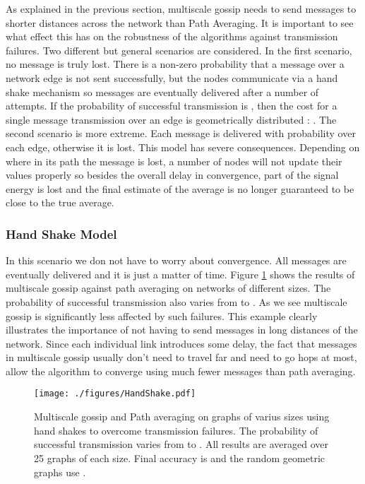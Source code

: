 As explained in the previous section, multiscale gossip needs to send messages to shorter distances across the network than Path Averaging. It is important to see what effect this has on the robustness of the algorithms against transmission failures. Two different but general scenarios are considered. In the first scenario, no message is truly lost. There is a non-zero probability that a message over a network edge is not sent successfully, but the nodes communicate via a hand shake mechanism so messages are eventually delivered after a number of attempts. If the probability of successful transmission is , then the cost for a single message transmission over an edge is geometrically distributed : . The second scenario is more extreme. Each message is delivered with probability  over each edge, otherwise it is lost. This model has  severe consequences. Depending on where in its path the message is lost, a number of nodes will not update their values properly so besides the overall delay in convergence, part of the signal energy is lost and the final estimate of the average is no longer guaranteed to be close to the true average. 

\subsubsection{Hand Shake Model}

In this scenario we don not have to worry about convergence. All messages are eventually delivered and it is just a matter of time. Figure \ref{fig:handshake} shows the results of multiscale gossip against path averaging on networks of different sizes. The probability of successful transmission also varies from  to . As we see multiscale gossip is significantly less affected by such failures. This example clearly illustrates the importance of not having to send messages in long distances of the network. Since each individual link introduces some delay, the fact that messages in multiscale gossip usually don't need to travel far and need to go  hops at most, allow the algorithm to converge using much fewer messages than path averaging.

\begin{figure} [t]
\begin{center}
\texttt{[image: ./figures/HandShake.pdf]}
\caption{\label{fig:handshake} Multiscale gossip and Path averaging on graphs of varius sizes using hand shakes to overcome transmission failures. The probability of successful transmission  varies from  to . All results are averaged over 25 graphs of each size. Final accuracy is  and the random geometric graphs use .} 
\end{center}
\end{figure}

